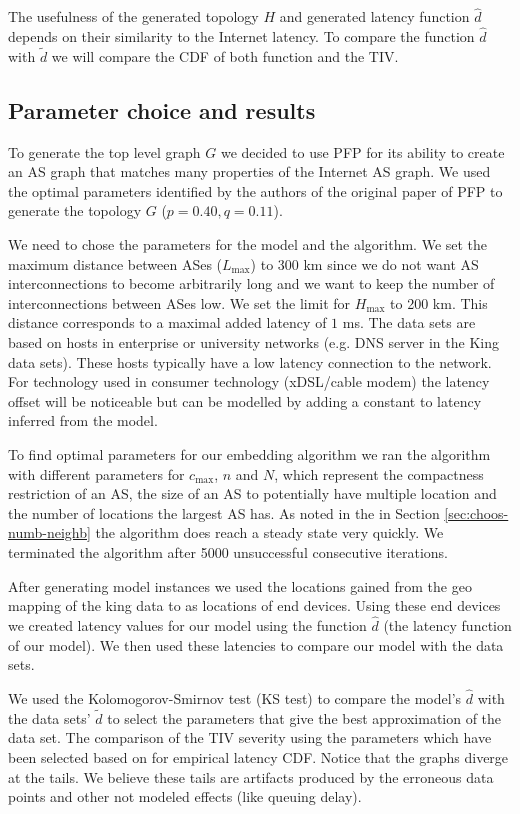 \documentclass{sig-alternate-10pt}
\begin{document}
\begin{enumerate}
The usefulness of the generated topology $H$ and generated latency function $\hat d$ depends on their similarity to the Internet latency. To compare the function $\hat{d}$ with $\tilde{d}$ we will compare the CDF of both function and the TIV. 

\subsection{Parameter choice and results}
\label{sec:param-choice-results}

To generate the top level graph $G$ we decided to use PFP \cite{pfp} for its ability to create an AS graph that matches many properties of the Internet AS graph. We used the optimal parameters identified by the authors of the original paper of  PFP to generate the topology $G$ ($p=0.40,q=0.11$). 

We need to chose the parameters for the model and the algorithm. 
We set the maximum distance between ASes ($L_{\max}$) to 300 km since we do not want AS interconnections to become arbitrarily long and we want to keep the number of interconnections between ASes low. 
We set the limit for $H_{\max}$ to 200 km. This distance corresponds to a maximal added latency of $1$ ms.  The data sets are based on hosts in enterprise or university networks (e.g. DNS server in the King data sets). These hosts typically have a low latency connection to the network. For technology used in consumer technology (xDSL/cable modem) the latency offset will be noticeable but can be modelled by adding a constant to latency inferred from the model.


To find optimal parameters for our embedding algorithm we ran the algorithm with different parameters for $c_{\max}$, $n$ and $N$, which represent the compactness restriction of an AS, the size of an AS to potentially have multiple location and the number of locations the largest AS has. 
As noted in the in Section \ref{sec:choos-numb-neighb} the algorithm does reach a steady state very quickly. We terminated the algorithm after 5000 unsuccessful consecutive iterations. 

After generating model instances we used the locations gained from the geo mapping of the king data to as locations of end devices. Using these end devices we created latency values for our model using the function $\hat{d}$ (the latency function of our model). We then used these latencies to compare our model with the data sets.

We used the  Kolomogorov-Smirnov test (KS test) to compare the model's $\hat d$ with the data sets' $\tilde d$ to select the parameters that give the best approximation of the data set. 
The comparison of the TIV severity using the parameters which have been selected based on for empirical latency CDF. Notice that the graphs diverge at the tails. We believe these tails are artifacts produced by the erroneous data points and other not modeled effects (like queuing delay).


\end{enumerate}
\end{document}
